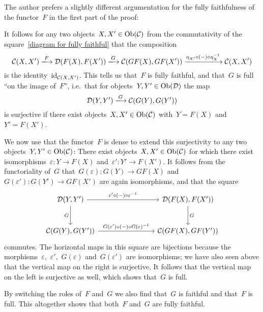 \begin{remark*}
  The author prefers a slightly different argumentation for the fully faithfulness of the functor~$F$ in the first part of the proof:
  
  It follows for any two objects~$X, X' \in \operatorname{Ob}(\mathcal{C})$ from the commutativity of the square~\eqref{diagram for fully faithful} that the composition
  \[
      \Ccat(X, X')
    \xlongto{F}
      \Dcat(F(X), F(X'))
    \xlongto{G}
      \Ccat(GF(X), GF(X'))
    \xlongto{\eta_{X'} \circ (-) \circ \eta^{-1}_X}
      \Ccat(X, X')
  \]
  is the identity~$\mathrm{id}_{\mathcal{C}(X,X')}$.
  This tells us that~$F$ is fully faithful, and that~$G$ is full \enquote{on the image of~$F$}, i.e.\ that for objects~$Y, Y' \in \operatorname{Ob}(\mathcal{D})$ the map
  \[
      \Dcat(Y, Y')
    \xlongto{G}
      \Ccat(G(Y), G(Y'))
  \]
  is surjective if there exist objects~$X, X' \in \operatorname{Ob}(\mathcal{C})$ with~$Y = F(X)$ and~$Y' = F(X')$.
  
  We now use that the functor~$F$ is dense to extend this surjectivity to any two objects~$Y, Y' \in \operatorname{Ob}(\mathcal{C})$:
  There exist objects~$X, X' \in \operatorname{Ob}(\mathcal{C})$ for which there exist isomorphisms~$\varepsilon \colon Y \to F(X)$ and~$\varepsilon' \colon Y' \to F(X')$.
  It follows from the functoriality of~$G$ that~$G(\varepsilon) \colon G(Y) \to GF(X)$ and~$G(\varepsilon') \colon G(Y') \to GF(X')$ are again isomorphisms, and that the square
  \[
    \begin{tikzcd}[row sep = large, column sep = 8em]
        \Dcat(Y, Y')
        \arrow{r}[above]{\varepsilon' \circ (-) \circ \varepsilon^{-1}}
        \arrow{d}[left]{G}
      & \Dcat(F(X), F(X'))
        \arrow{d}[right]{G}
      \\
        \Ccat(G(Y), G(Y'))
        \arrow{r}[above]{G(\varepsilon') \circ (-) \circ G(\varepsilon)^{-1}}
      & \Ccat(GF(X), GF(Y'))
    \end{tikzcd}
  \]
  commutes.
  The horizontal maps in this square are bijections because the morphisms~$\varepsilon$,~$\varepsilon'$,~$G(\varepsilon)$ and~$G(\varepsilon')$ are isomorphisms;
  we have also seen above that the vertical map on the right is surjective, 
  It follows that the vertical map on the left is surjective as well, which shows that~$G$ is full.
  
  By switching the roles of~$F$ and~$G$ we also find that~$G$ is faithful and that~$F$ is full.
  This altogether shows that both~$F$ and~$G$ are fully faithful.
\end{remark*}





